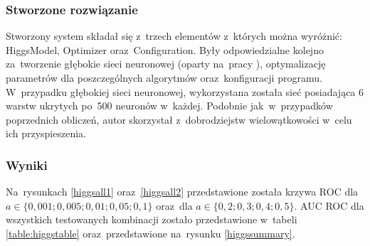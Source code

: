 \subsubsection{Stworzone rozwiązanie}
Stworzony system składał się z~trzech elementów z~których można wyróżnić: HiggsModel, Optimizer oraz~Configuration. Były odpowiedzialne kolejno za~tworzenie głębokie sieci neuronowej (oparty na~pracy \cite{higgs2}), optymalizację parametrów dla poszczególnych algorytmów oraz~konfiguracji programu. W~przypadku głębokiej sieci neuronowej, wykorzystana została sieć posiadająca 6 warstw ukrytych po~500 neuronów w~każdej. Podobnie jak~w~przypadków poprzednich obliczeń, autor skorzystał z~dobrodziejstw wielowątkowości w~celu ich przyspieszenia.


\subsubsection{Wyniki}
Na~rysunkach \ref{higgsall1} oraz~\ref{higgsall2} przedstawione została krzywa ROC dla $a\in\{0,001; 0,005; 0,01; 0,05; 0,1\}$  oraz~dla $a\in\{0,2; 0,3; 0,4; 0,5\}$. AUC ROC dla wszystkich testowanych kombinacji zostało przedstawione w~tabeli \ref{table:higgstable} oraz~przedstawione na~rysunku \ref{higgssummary}.


